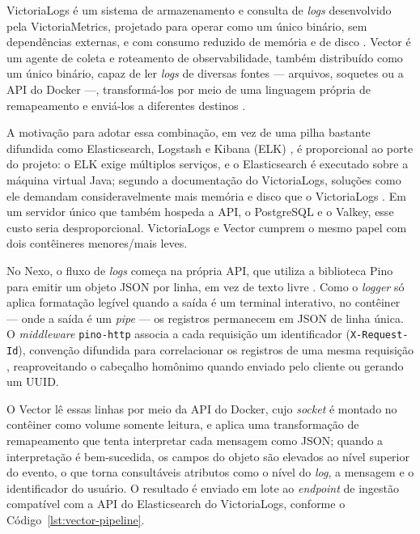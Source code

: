 VictoriaLogs é um sistema de armazenamento e consulta de \textit{logs}
desenvolvido pela VictoriaMetrics, projetado para operar como um único binário,
sem dependências externas, e com consumo reduzido de memória e de disco
\citep{victorialogs:2026}. Vector é um agente de coleta e roteamento de
observabilidade, também distribuído como um único binário, capaz de ler
\textit{logs} de diversas fontes --- arquivos, soquetes ou a API do Docker ---,
transformá-los por meio de uma linguagem própria de remapeamento e enviá-los a
diferentes destinos \citep{vector:2026}.

A motivação para adotar essa combinação, em vez de uma pilha bastante difundida
como Elasticsearch, Logstash e Kibana (ELK) \citep{elastic:2026}, é
proporcional ao porte do projeto: o ELK exige múltiplos serviços, e o
Elasticsearch é executado sobre a máquina virtual Java; segundo a documentação
do VictoriaLogs, soluções como ele demandam consideravelmente mais memória e
disco que o VictoriaLogs \citep{victorialogs:2026}. Em um servidor único que
também hospeda a API, o PostgreSQL e o Valkey, esse custo seria
desproporcional. VictoriaLogs e Vector cumprem o mesmo papel com dois
contêineres menores/mais leves.

No Nexo, o fluxo de \textit{logs} começa na própria API, que utiliza a
biblioteca Pino para emitir um objeto JSON por linha, em vez de texto livre
\citep{pino:2026}. Como o \textit{logger} só aplica formatação legível quando a
saída é um terminal interativo, no contêiner --- onde a saída é um
\textit{pipe} --- os registros permanecem em JSON de linha única. O
\textit{middleware} \texttt{pino-http} associa a cada requisição um
identificador (\texttt{X-Request-Id}), convenção difundida para correlacionar
os registros de uma mesma requisição \citep{heroku:2026}, reaproveitando o
cabeçalho homônimo quando enviado pelo cliente ou gerando um UUID.

O Vector lê essas linhas por meio da API do Docker, cujo \textit{socket} é
montado no contêiner como volume somente leitura, e aplica uma transformação de
remapeamento que tenta interpretar cada mensagem como JSON; quando a
interpretação é bem-sucedida, os campos do objeto são elevados ao nível
superior do evento, o que torna consultáveis atributos como o nível do
\textit{log}, a mensagem e o identificador do usuário. O resultado é enviado em
lote ao \textit{endpoint} de ingestão compatível com a API do Elasticsearch do
VictoriaLogs, conforme o Código~\ref{lst:vector-pipeline}.

